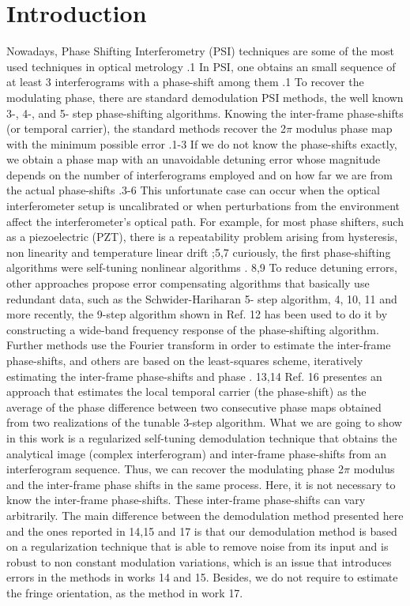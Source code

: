 \documentclass[letterpaper,12pt]{article}   %
\begin{document}
\section{Introduction}
Nowadays, Phase Shifting Interferometry (PSI) techniques are some of the most used techniques in optical metrology \cite{a1_OpticalTesting}.1 In PSI, one obtains an small sequence of at least 3 interferograms with a phase-shift among them \cite{a1_OpticalTesting}.1 To recover the modulating phase, there are standard demodulation PSI methods, the well known 3-, 4-, and 5- step phase-shifting algorithms. Knowing the inter-frame phase-shifts (or temporal carrier), the standard methods recover the 2$\pi$ modulus phase map with the minimum possible error \cite{a1_OpticalTesting,a2_F&K,a3}.1-3 If we do not know the phase-shifts exactly, we obtain a phase map with an unavoidable detuning error whose magnitude depends on the number of interferograms employed and on how far we are from the actual phase-shifts \cite{a3,a4,a5,a6}.3-6 This unfortunate case can occur when the optical interferometer setup is uncalibrated or when perturbations from the environment affect the interferometer's optical path. For example, for most phase shifters, such as a piezoelectric (PZT), there is a repeatability problem arising from hysteresis, non linearity and temperature linear drift \cite{a5,a7};5,7 curiously, the first phase-shifting algorithms were self-tuning nonlinear algorithms \cite{a8,a9}. 8,9 To reduce detuning errors, other approaches propose error compensating algorithms that basically use redundant data, such as the Schwider-Hariharan 5- step algorithm, \cite{a4,a10,a11} 4, 10, 11 and more recently, the 9-step algorithm shown in Ref. \cite{a12}12 has been used to do it by constructing a wide-band frequency response of the phase-shifting algorithm. Further methods use the Fourier transform in order to estimate the inter-frame phase-shifts, and others are based on the least-squares scheme, iteratively estimating the inter-frame phase-shifts and phase \cite{a13,a14}. 13,14 Ref. \cite{a16}16 presentes an approach that estimates the local temporal carrier (the phase-shift) as the average of the phase difference between two consecutive phase maps obtained from two realizations of the tunable 3-step algorithm. What we are going to show in this work is a regularized self-tuning demodulation technique that obtains the analytical image (complex interferogram) and inter-frame phase-shifts from an interferogram sequence. Thus, we can recover the modulating phase 2$\pi$ modulus and the inter-frame phase shifts in the same process. Here, it is not necessary to know the inter-frame phase-shifts. These inter-frame phase-shifts can vary arbitrarily. The main difference between the demodulation method presented here and the ones reported in  \cite{a14}14,\cite{a15}15 and \cite{a17}17 is that our demodulation method is based on a regularization technique that is able to remove noise from its input and is robust to non constant modulation variations, which is an issue that introduces errors in the methods in works \cite{a14} 14 and \cite{a15}15. Besides, we do not require to estimate the fringe orientation, as the method in work \cite{a17}17.
\end{document}

